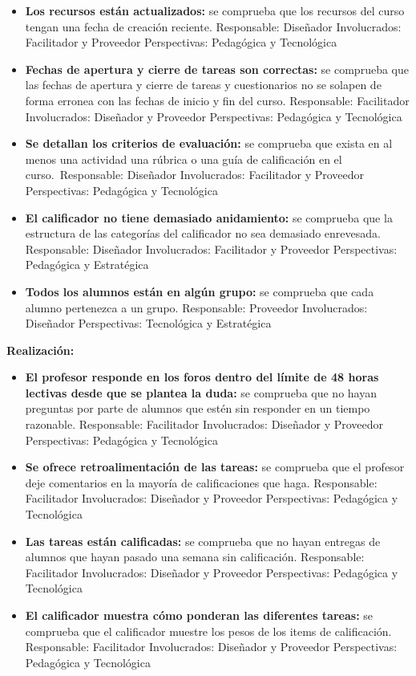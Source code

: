 \begin{itemize}
	\item
	\textbf{Los recursos están actualizados:} se comprueba que los
	recursos del curso tengan una fecha de creación reciente.
	{Responsable:} Diseñador {Involucrados:} Facilitador y
	Proveedor {Perspectivas:} Pedagógica y Tecnológica
	\item
	\textbf{Fechas de apertura y cierre de tareas son correctas:} se
	comprueba que las fechas de apertura y cierre de tareas y
	cuestionarios no se solapen de forma erronea con las fechas de inicio
	y fin del curso. {Responsable:} Facilitador
	{Involucrados:} Diseñador y Proveedor {Perspectivas:}
	Pedagógica y Tecnológica
	\item
	\textbf{Se detallan los criterios de evaluación:} se comprueba que
	exista en al menos una actividad una rúbrica o una guía de calificación
	en el curso.~{Responsable:} Diseñador {Involucrados:}
	Facilitador y Proveedor {Perspectivas:} Pedagógica y Tecnológica
	\item
	\textbf{El calificador no tiene demasiado anidamiento:} se comprueba
	que la estructura de las categorías del calificador no sea demasiado
	enrevesada. {Responsable:} Diseñador {Involucrados:}
	Facilitador y Proveedor {Perspectivas:} Pedagógica y Estratégica
	\item
	\textbf{Todos los alumnos están en algún grupo:} se comprueba que cada
	alumno pertenezca a un grupo. {Responsable:} Proveedor
	{Involucrados:} Diseñador {Perspectivas:} Tecnológica y
	Estratégica
\end{itemize}

\textbf{Realización:}

\begin{itemize}
	\item
	\textbf{El profesor responde en los foros dentro del límite de 48
		horas lectivas desde que se plantea la duda:} se comprueba que no
	hayan preguntas por parte de alumnos que estén sin responder en un
	tiempo razonable. {Responsable:} Facilitador
	{Involucrados:} Diseñador y Proveedor {Perspectivas:}
	Pedagógica y Tecnológica
	\item
	\textbf{Se ofrece retroalimentación de las tareas:} se comprueba que
	el profesor deje comentarios en la mayoría de calificaciones que haga.
	{Responsable:} Facilitador {Involucrados:} Diseñador y
	Proveedor {Perspectivas:} Pedagógica y Tecnológica
	\item
	\textbf{Las tareas están calificadas:} se comprueba que no hayan
	entregas de alumnos que hayan pasado una semana sin calificación.
	{Responsable:} Facilitador {Involucrados:} Diseñador y
	Proveedor {Perspectivas:} Pedagógica y Tecnológica
	\item
	\textbf{El calificador muestra cómo ponderan las diferentes tareas:}
	se comprueba que el calificador muestre los pesos de los items de
	calificación. {Responsable:} Facilitador {Involucrados:}
	Diseñador y Proveedor {Perspectivas:} Pedagógica y Tecnológica
\end{itemize}

